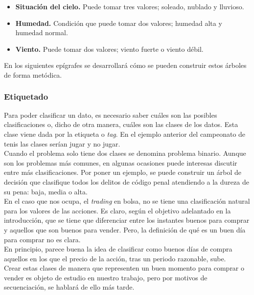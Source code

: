 			\begin{itemize}
				\item \textbf{Situaci\'on del cielo.} Puede tomar tres valores; soleado, nublado y lluvioso.
				
				\item \textbf{Humedad.} Condici\'on que puede tomar dos valores; humedad alta y humedad normal.
				
				\item \textbf{Viento.} Puede tomar dos valores; viento fuerte o viento d\'ebil.
			\end{itemize}
		
			En los siguientes ep\'igrafes se desarrollar\'a c\'omo se pueden construir estos \'arboles de forma met\'odica.\\
			 
			\subsubsection{Etiquetado}
			Para poder clasificar un dato, es necesario saber cu\'ales son las posibles clasificaciones o, dicho de otra manera, cu\'ales son las clases de los datos. Esta clase viene dada por la etiqueta o \textit{tag}. En el ejemplo anterior del campeonato de tenis las clases ser\'ian jugar y no jugar.\\
			
			Cuando el problema solo tiene dos clases se denomina problema binario. Aunque son los problemas m\'as comunes, en algunas ocasiones puede interesas discutir entre m\'as clasificaciones. Por poner un ejemplo, se puede construir un \'arbol de decisi\'on que clasifique todos los delitos de c\'odigo penal atendiendo a la dureza de su pena: baja, media o alta.\\
			
			En el caso que nos ocupa, el \textit{trading} en bolsa, no se tiene una clasificaci\'on natural para los valores de las acciones. Es claro, seg\'un el objetivo adelantado en la introducci\'on, que se tiene que diferenciar entre los instantes buenos para comprar y aquellos que son buenos para vender. Pero, la definici\'on de qu\'e es un buen d\'ia para comprar no es clara. \\
			
			En principio, parece buena la idea de clasificar como buenos d\'ias de compra aquellos en los que el precio de la acci\'on, tras un periodo razonable, sube.  \\
			
			Crear estas clases de manera que representen un buen momento para comprar o vender es objeto de estudio en nuestro trabajo, pero por motivos de secuenciaci\'on, se hablar\'a de ello m\'as tarde.\\
			
